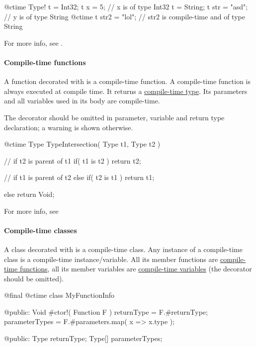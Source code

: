 \begin{code}
@ctime Type! t = Int32;
t x = 5; // x is of type Int32
t = String;
t str = "asd"; // y is of type String
@ctime t str2 = "lol"; // str2 is compile-time and of type String
\end{code}

For more info, see .

\paragraph{Compile-time functions}
A function decorated with  is a compile-time function. A compile-time function is always executed at compile time. It returns a \hyperref[ctime:class]{compile-time type}. Its parameters and all variables used in its body are compile-time.

The  decorator should be omitted in parameter, variable and return type declaration; a warning is shown otherwise.

\begin{code}
@ctime Type TypeIntersection( Type t1, Type t2 ) {
	// if t2 is parent of t1
	if( t1 is t2 )
		return t2;
		
	// if t1 is parent of t2
	else if( t2 is t1 )
		return t1;
	
	else
		return Void;
}
\end{code}

For more info, see 

\paragraph{Compile-time classes}
A class decorated with  is a compile-time class. Any instance of a compile-time class is a compile-time instance/variable. All its member functions are \hyperref[ctime:function]{compile-time functions}, all its member variables are \hyperref[ctime:variable]{compile-time variables} (the  decorator should be omitted).

\begin{code}
@final @ctime class MyFunctionInfo {

@public:
	Void #ctor!( Function F ) {
		returnType = F.#returnType;
		parameterTypes = F.#parameters.map( x => x.type );
	}
	
@public:
	Type returnType;
	Type[] parameterTypes;	
	
}
\end{code}

